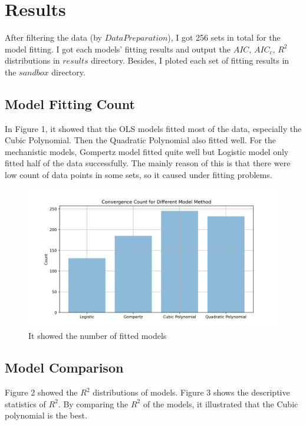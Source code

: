 \documentclass[11pt]{article}
\begin{document}
 \newpage
 \section{Results}
After filtering the data (by $Data Preparation$), I got 256 sets in total for the model fitting. I got each models' fitting results and output the $AIC$, $AIC_c$, $R^2$ distributions in $results$ directory. Besides, I ploted each set of fitting results in the $sandbox$ directory.
  \subsection{Model Fitting Count}
    In Figure 1, it showed that the OLS models fitted most of the data, especially the Cubic Polynomial. Then the Quadratic Polynomial also fitted well. For the mechanistic models, Gompertz model fitted quite well but Logistic model only fitted half of the data successfully. 
    The mainly reason of this is that there were low count of data points in some sets, so it caused under fitting problems.

    \begin{figure}[H]
      \centering
      \includegraphics[width=\textwidth]{../results/Model_Convergence_Count.png}
      \caption{It showed the number of fitted models}
    \end{figure}
  
  \newpage
  \subsection{Model Comparison}
    Figure 2 showed the $R^2$ distributions of models. Figure 3 shows the descriptive statistics of $R^2$.
    By comparing the $R^2$ of the models, it illustrated that the Cubic polynomial is the best.
\end{document}
